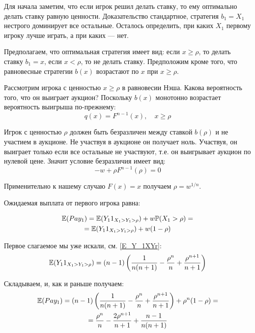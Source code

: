 \begin{enumerate}
Для начала заметим, что если игрок решил делать ставку, то ему оптимально делать ставку равную ценности. Доказательство стандартное, стратегия $ b_{1}=X_{1} $ нестрого доминирует все остальные. Осталось определить, при каких $ X_{1} $ первому игроку лучше играть, а при каких  --- нет. 

Предполагаем, что оптимальная стратегия имеет вид: если $ x\geq \rho $, то делать ставку $ b_{1}=x $, если $ x<\rho $, то не делать ставку. Предположим кроме того, что равновесные стратегии $ b(x) $ возрастают по $ x $ при $ x\geq \rho $. 

Рассмотрим игрока с ценностью $ x\geq \rho $ в равновесии Нэша. Какова вероятность того, что он выиграет аукцион? Поскольку $ b(x) $ монотонно возрастает вероятность выигрыша по-прежнему:
\begin{equation}
q(x)=F^{n-1}(x),\quad x\geq \rho
\end{equation}

Игрок с ценностью $ \rho $ должен быть безразличен между ставкой $ b(\rho) $ и не участием в аукционе. Не участвуя в аукционе он получает ноль. Участвуя, он выиграет только если все остальные не участвуют, т.е. он выигрывает аукцион по нулевой цене. Значит условие безразличия имеет вид:
\begin{equation}
-w+\rho F^{n-1}(\rho)=0
\end{equation}

Применительно к нашему случаю $ F(x)=x $ получаем $ \rho=w^{1/n} $.


Ожидаемая выплата от первого игрока равна:

\begin{multline}
\mathbb{E}(Pay_{1})=\mathbb{E}(Y_{1}1_{X_{1}>Y_{1}>\rho})+w\mathbb{P}(X_{1}>\rho)=\\
=\mathbb{E}(Y_{1}1_{X_{1}>Y_{1}>\rho})+w(1-\rho)
\end{multline}

Первое слагаемое мы уже искали, см. \ref{E_Y_1XYr}:
\begin{equation}
\mathbb{E}(Y_{1}1_{X_{1}>Y_{1}>\rho})=(n-1)\left(\frac{1}{n(n+1)}-\frac{\rho^{n}}{n}+\frac{\rho^{n+1}}{n+1}\right)
\end{equation}

Складываем, и, как и раньше получаем:
\begin{multline}
\mathbb{E}(Pay_{1})=(n-1)\left(\frac{1}{n(n+1)}-\frac{\rho^{n}}{n}+\frac{\rho^{n+1}}{n+1}\right)+\rho^{n}(1-\rho)=\\
=\frac{\rho^{n}}{n}-\frac{2\rho^{n+1}}{n+1}+\frac{n-1}{n(n+1)}
\end{multline}


\end{enumerate}
